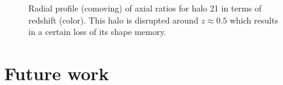 \documentclass[xcolor=dvipsnames]{beamer}
\begin{document}
\begin{frame}[plain]
\begin{figure}[!ht]
  \centering
  \hfill
  \caption{Radial profile (comoving) of axial ratios for halo 21 in terms of redshift (color). This halo is disrupted around $z \approx 0.5$ which results in a certain loss of its shape memory.}
  \label{fig:RedshiftBad}
\end{figure}


\end{frame}




\section{Future work}
\end{document}
